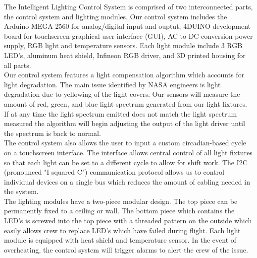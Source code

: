 \documentclass[12pt,a4paper]{report}
\begin{document}
The Intelligent Lighting Control System is comprised of two interconnected parts, the control system and lighting modules. Our control system includes the Arduino MEGA 2560 for analog/digital input and ouptut, 4DUINO development board for touchscreen graphical user interface (GUI), AC to DC conversion power supply, RGB light and temperature sensors. Each light module include 3 RGB LED's, aluminum heat shield, Infineon RGB driver, and 3D printed housing for all parts.\\ \linebreak
Our control system features a light compensation algorithm which accounts for light degradation. The main issue identified by NASA engineers is light degradation due to yellowing of the light covers. Our sensors will measure the amount of red, green, and blue light spectrum generated from our light fixtures. If at any time the light spectrum emitted does not match the light spectrum measured the algorithm will begin adjusting the output of the light driver until the spectrum is back to normal.\\ \linebreak
The control system also allows the user to input a custom circadian-based cycle on a touchscreen interface. The interface allows central control of all light fixtures so that each light can be set to a different cycle to allow for shift work. The I2C (pronounced "I squared C") communication protocol allows us to control individual devices on a single bus which reduces the amount of cabling needed in the system.\\ \linebreak
The lighting modules have a two-piece modular design. The top piece can be permanently fixed to a ceiling or wall. The bottom piece which contains the LED's is screwed into the top piece with a threaded pattern on the outside which easily allows crew to replace LED's which have failed during flight. Each light module is equipped with heat shield and temperature sensor. In the event of overheating, the control system will trigger alarms to alert the crew of the issue.
\end{document}
